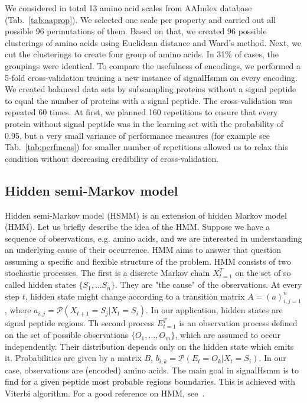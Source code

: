 \documentclass[fleqn,10pt,twoside]{gcb15submission}
\begin{document}
We considered in total 13 amino acid scales from AAIndex database~\citep{2008kawashimaaaindex} (Tab.~\ref{tab:aaprop}). We selected one scale per property and carried out all possible 96 permutations of them. Based on that, we created 96 possible clusterings of amino acids using Euclidean distance and Ward's method. Next, we cut the clusterings to create four group of amino acids. In 31\% of cases, the groupings were identical. To compare the usefulness of encodings, we performed a 5-fold cross-validation training a new instance of signalHsmm on every encoding. We created balanced data sets by subsampling proteins without a signal peptide to equal the number of proteins with a signal peptide. The cross-validation was repeated 60 times. At first, we planned 160 repetitions to ensure that every protein without signal peptide was in the learning set with the probability of 0.95, but a very small variance of performance measures (for example see Tab.~\ref{tab:perfmeas}) for smaller number of repetitions allowed us to relax this condition without decreasing credibility of cross-validation.

\subsection*{Hidden semi-Markov model}
Hidden semi-Markov model (HSMM) is an extension of hidden Markov model (HMM). 
Let us briefly describe the idea of the HMM. 
Suppose we have a sequence of observations, e.g. amino acids, and we are interested in understanding an underlying cause of their occurrence. 
HMM aims to answer that question assuming a specific and flexible structure of the problem.
HMM consists of two stochastic processes. The first is a discrete Markov chain $X_{t=1}^T$ on the set of so called hidden states $\{S_1, \dots S_n\}$.
They are "the cause" of the observations. At every step $t$, hidden state might change according to a transition matrix
$A= (a)_{i,j=1}^n$, where $a_{i,j} = \mathcal{P}(X_{t+1} = S_j | X_t = S_i)$. In our application, hidden states are signal peptide regions.
Th second process $E_{t=1}^T$ is an observation process defined on the set of possible observations $\{O_1, \dots, O_m\}$, which are assumed to occur independently. Their distribution depends only on the hidden state which emits it. 
Probabilities are given by a matrix $B$, $b_{i,k} = \mathcal{P}(E_t = O_k | X_t = S_i)$.
In our case, observations are (encoded) amino acids.
The main goal in signalHsmm is to find for a given peptide most probable regions boundaries. This is achieved with Viterbi algorithm.
For a good reference on HMM, see~\citep{1989rabinera}.
\end{document}
